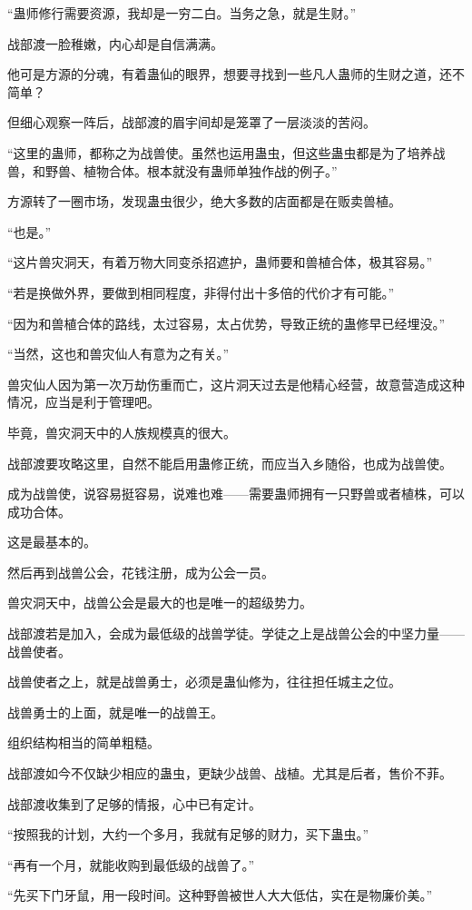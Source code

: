 \begin{this_body}
“蛊师修行需要资源，我却是一穷二白。当务之急，就是生财。”

战部渡一脸稚嫩，内心却是自信满满。

他可是方源的分魂，有着蛊仙的眼界，想要寻找到一些凡人蛊师的生财之道，还不简单？

但细心观察一阵后，战部渡的眉宇间却是笼罩了一层淡淡的苦闷。

“这里的蛊师，都称之为战兽使。虽然也运用蛊虫，但这些蛊虫都是为了培养战兽，和野兽、植物合体。根本就没有蛊师单独作战的例子。”

方源转了一圈市场，发现蛊虫很少，绝大多数的店面都是在贩卖兽植。

“也是。”

“这片兽灾洞天，有着万物大同变杀招遮护，蛊师要和兽植合体，极其容易。”

“若是换做外界，要做到相同程度，非得付出十多倍的代价才有可能。”

“因为和兽植合体的路线，太过容易，太占优势，导致正统的蛊修早已经埋没。”

“当然，这也和兽灾仙人有意为之有关。”

兽灾仙人因为第一次万劫伤重而亡，这片洞天过去是他精心经营，故意营造成这种情况，应当是利于管理吧。

毕竟，兽灾洞天中的人族规模真的很大。

战部渡要攻略这里，自然不能启用蛊修正统，而应当入乡随俗，也成为战兽使。

成为战兽使，说容易挺容易，说难也难——需要蛊师拥有一只野兽或者植株，可以成功合体。

这是最基本的。

然后再到战兽公会，花钱注册，成为公会一员。

兽灾洞天中，战兽公会是最大的也是唯一的超级势力。

战部渡若是加入，会成为最低级的战兽学徒。学徒之上是战兽公会的中坚力量——战兽使者。

战兽使者之上，就是战兽勇士，必须是蛊仙修为，往往担任城主之位。

战兽勇士的上面，就是唯一的战兽王。

组织结构相当的简单粗糙。

战部渡如今不仅缺少相应的蛊虫，更缺少战兽、战植。尤其是后者，售价不菲。

战部渡收集到了足够的情报，心中已有定计。

“按照我的计划，大约一个多月，我就有足够的财力，买下蛊虫。”

“再有一个月，就能收购到最低级的战兽了。”

“先买下门牙鼠，用一段时间。这种野兽被世人大大低估，实在是物廉价美。”


\end{this_body}
